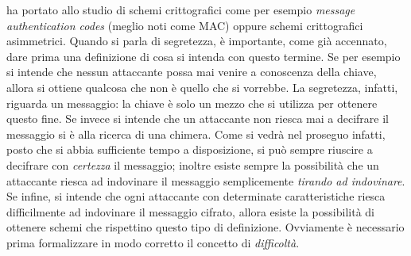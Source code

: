 \documentclass[a4paper,openright,twoside,12pt]{report}
\begin{document}
ha portato allo studio di schemi crittografici come per esempio \emph{message authentication codes} (meglio noti come MAC) oppure schemi crittografici asimmetrici.
Quando si parla di segretezza, \`e importante, come gi\`a accennato, dare prima una definizione di cosa si intenda con questo termine.
Se per esempio si intende che nessun attaccante possa mai venire a conoscenza della chiave, 
allora si ottiene qualcosa che non \`e quello che si vorrebbe. La segretezza, infatti, riguarda un messaggio:
la chiave \`e solo un mezzo che si utilizza per ottenere questo fine. 
Se invece si intende che un attaccante non riesca mai a decifrare il messaggio si \`e alla ricerca di una chimera. Come si vedr\`a nel proseguo infatti, posto che si abbia sufficiente tempo 
a disposizione, si pu\`o sempre riuscire a decifrare con \emph{certezza} il messaggio; inoltre esiste sempre la possibilit\`a che un attaccante riesca ad indovinare il messaggio
semplicemente \emph{tirando ad indovinare}. Se infine, si intende che ogni attaccante con determinate caratteristiche riesca difficilmente ad indovinare il messaggio cifrato, allora esiste la 
possibilit\`a di ottenere schemi che rispettino questo tipo di definizione. Ovviamente \`e necessario prima formalizzare in modo 
corretto il concetto di \emph{difficolt\`a}.
\end{document}
